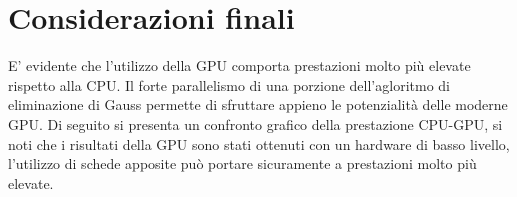 \documentclass{article}
\begin{document}
\section{Considerazioni finali}
E' evidente che l'utilizzo della GPU comporta prestazioni molto più elevate rispetto alla CPU. Il forte parallelismo di una porzione dell'agloritmo di eliminazione di Gauss permette di sfruttare appieno le potenzialità delle moderne GPU. Di seguito si presenta un confronto grafico della prestazione CPU-GPU, si noti che i risultati della GPU sono stati ottenuti con un hardware di basso livello, l'utilizzo di schede apposite può portare sicuramente a prestazioni molto più elevate.

\end{document}
